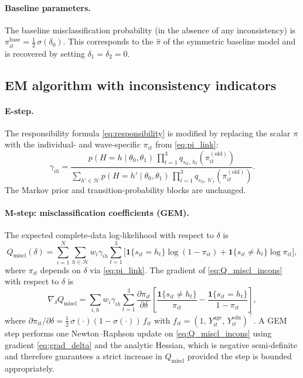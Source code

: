 \documentclass[12pt]{article}
\begin{document}
\paragraph{Baseline parameters.}
The baseline misclassification probability (in the absence of any
inconsistency) is \(\pi_{it}^{\text{base}} = \frac{1}{2}\,\sigma(\delta_0)\).
This corresponds to the \(\hat\pi\) of the symmetric baseline model and
is recovered by setting \(\delta_1 = \delta_2 = 0\).

\subsection{EM algorithm with inconsistency indicators}

\paragraph{E-step.}
The responsibility formula \eqref{eq:responsibility} is modified by
replacing the scalar \(\pi\) with the individual- and wave-specific
\(\pi_{it}\) from \eqref{eq:pi_link}:
\begin{equation}
\gamma_{ih} =
\frac{
  p(H = h \mid \theta_0, \theta_1)\,
  \prod_{t=1}^{3} q_{s_{it},\, h_t}(\pi_{it}^{(\text{old})})
}{
  \sum_{h' \in \mathcal{H}}
  p(H = h' \mid \theta_0, \theta_1)\,
  \prod_{t=1}^{3} q_{s_{it},\, h'_t}(\pi_{it}^{(\text{old})})
}.
\label{eq:responsibility_incons}
\end{equation}
The Markov prior and transition-probability blocks are unchanged.

\paragraph{M-step: misclassification coefficients (GEM).}
The expected complete-data log-likelihood with respect to \(\delta\) is
\begin{equation}
Q_{\text{miscl}}(\delta) = \sum_{i=1}^{N} \sum_{h \in \mathcal{H}}
  w_i \gamma_{ih}
  \sum_{t=1}^{3} \Big[
    \mathbf{1}\{s_{it} = h_t\}\log(1 - \pi_{it})
    + \mathbf{1}\{s_{it} \neq h_t\}\log\pi_{it}
  \Big],
\label{eq:Q_miscl_incons}
\end{equation}
where \(\pi_{it}\) depends on \(\delta\) via \eqref{eq:pi_link}. The
gradient of \eqref{eq:Q_miscl_incons} with respect to \(\delta\) is
\begin{equation}
\nabla_\delta Q_{\text{miscl}} = \sum_{i,h} w_i \gamma_{ih}
  \sum_{t=1}^{3}
  \frac{\partial \pi_{it}}{\partial \delta}
  \left[
    \frac{\mathbf{1}\{s_{it} \neq h_t\}}{\pi_{it}}
    - \frac{\mathbf{1}\{s_{it} = h_t\}}{1 - \pi_{it}}
  \right],
\label{eq:grad_delta}
\end{equation}
where \(\partial \pi_{it}/\partial \delta =
\tfrac{1}{2}\,\sigma(\cdot)(1 - \sigma(\cdot))\, f_{it}\)
with \(f_{it} = (1,\, Y_{it}^{\text{age}},\, Y_{it}^{\text{edu}})^\top\).
A GEM step performs one Newton--Raphson update on
\eqref{eq:Q_miscl_incons} using gradient \eqref{eq:grad_delta} and the
analytic Hessian, which is negative semi-definite and therefore
guarantees a strict increase in \(Q_{\text{miscl}}\) provided the step
is bounded appropriately.
\end{document}
